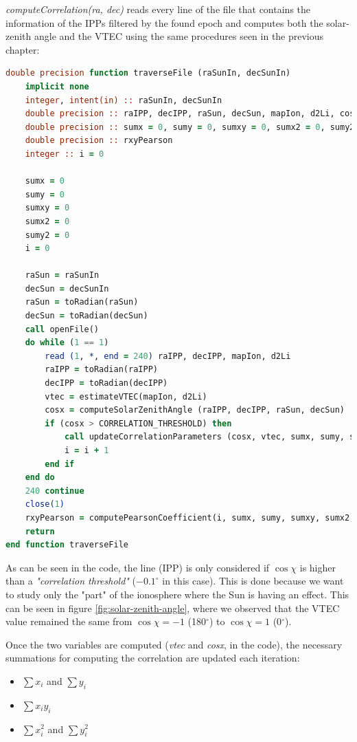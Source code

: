 \textit{computeCorrelation(ra, dec)} reads every line of the file that contains the information of the IPPs filtered by the found epoch and computes both the solar-zenith angle and the VTEC using the same procedures seen in the previous chapter:

\begin{minipage}{\linewidth}
\begin{lstlisting}[language=Fortran, caption=Correlation computation]
double precision function traverseFile (raSunIn, decSunIn)
	implicit none
	integer, intent(in) :: raSunIn, decSunIn
	double precision :: raIPP, decIPP, raSun, decSun, mapIon, d2Li, cosX, vtec
	double precision :: sumx = 0, sumy = 0, sumxy = 0, sumx2 = 0, sumy2 = 0
	double precision :: rxyPearson
	integer :: i = 0
	
	sumx = 0
	sumy = 0
	sumxy = 0
	sumx2 = 0
	sumy2 = 0
	i = 0
	
	raSun = raSunIn
	decSun = decSunIn
	raSun = toRadian(raSun)
	decSun = toRadian(decSun)
	call openFile()
	do while (1 == 1)
		read (1, *, end = 240) raIPP, decIPP, mapIon, d2Li
		raIPP = toRadian(raIPP)
		decIPP = toRadian(decIPP)
		vtec = estimateVTEC(mapIon, d2Li)
		cosx = computeSolarZenithAngle (raIPP, decIPP, raSun, decSun)
		if (cosx > CORRELATION_THRESHOLD) then
			call updateCorrelationParameters (cosx, vtec, sumx, sumy, sumxy, sumx2, sumy2)
			i = i + 1
		end if	
	end do
	240 continue
	close(1)
	rxyPearson = computePearsonCoefficient(i, sumx, sumy, sumxy, sumx2, sumy2)
	return
end function traverseFile
\end{lstlisting}
\end{minipage}

As can be seen in the code, the line (IPP) is only considered if $\cos\chi$ is higher than a \textit{"correlation threshold"} ($-0.1^{\circ}$ in this case). This is done because we want to study only the "part" of the ionosphere where the Sun is having an effect. This can be seen in figure \ref{fig:solar-zenith-angle}, where we observed that the VTEC value remained the same from $\cos\chi = -1$ (180$^{\circ}$) to $\cos\chi = 1$ (0$^{\circ}$).

Once the two variables are computed (\textit{vtec} and \textit{cosx}, in the code), the necessary summations for computing the correlation are updated each iteration:

\begin{itemize}
	\item $\sum x_{i}$ and $\sum y_{i}$
	\item $\sum x_{i}y_{i}$
	\item $\sum x_{i}^{2}$ and $\sum y_{i}^{2}$
\end{itemize}

